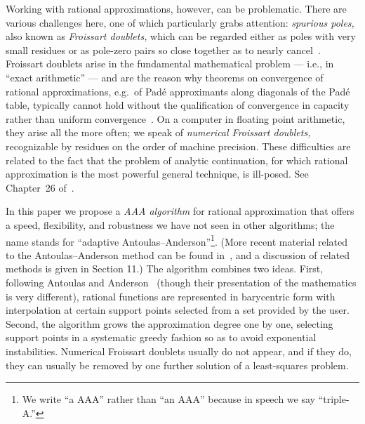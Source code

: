 \documentclass[final]{siamltex}
\begin{document}
Working with rational approximations, however, can be problematic.
There are various challenges here, one of which particularly
grabs attention: {\em spurious poles,} also known as {\em
Froissart doublets,} which can be regarded either as poles with
very small residues or as pole-zero pairs so close together as to
nearly cancel~\cite{bz13,froissart,gk03,gp97,gp99,stahlspurious}.
Froissart doublets arise in the fundamental mathematical problem
--- i.e., in ``exact arithmetic'' --- and are the reason why
theorems on convergence of rational approximations, e.g.\ of
Pad\'e approximants along diagonals of the Pad\'e table, typically
cannot hold without the qualification of convergence in capacity
rather than uniform convergence~\cite{bgm,pomm}.  On a computer
in floating point arithmetic, they arise all the more often;
we speak of {\em numerical Froissart doublets,} recognizable by
residues on the order of machine precision.  These difficulties
are related to the fact that the problem of analytic continuation,
for which rational approximation is the most powerful general
technique, is ill-posed.  See Chapter~26 of~\cite{atap}.

In this paper we propose a {\em AAA algorithm\/} for rational
approximation that offers a speed, flexibility, and robustness
we have not seen in other algorithms; the name stands for
``adaptive Antoulas--Anderson''\footnote{We write ``a AAA''
rather than ``an AAA'' because in speech we say ``triple-A.''}.
(More recent material related to the Antoulas--Anderson method can
be found in~\cite{ionita}, and a
discussion of related methods is given in Section 11.)
The algorithm combines two ideas.  First, following Antoulas and
Anderson~\cite{aa} (though their presentation of the mathematics
is very different), rational functions are represented in
barycentric form with interpolation at certain support points
selected from a set provided by the user. 
Second, the algorithm
grows the approximation degree one by one, selecting support
points in a systematic greedy fashion so as to avoid exponential
instabilities.  Numerical Froissart doublets usually
do not appear, and if they do, they can usually be removed by
one further solution of a least-squares problem.
\end{document}
